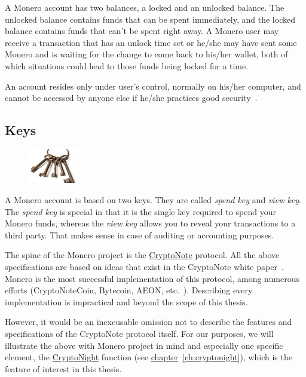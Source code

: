 A Monero account has two balances, a locked and an unlocked balance. The unlocked balance contains funds that can be spent immediately, and the locked balance contains funds that can't be spent right away. A Monero user may receive a transaction that has an unlock time set or he/she may have sent some Monero and is waiting for the change to come back to his/her wallet, both of which situations could lead to those funds being locked for a time.

An account resides only under user's control, normally on his/her computer, and cannot be accessed by anyone else if he/she practices good security~\cite{getmonero}.

\subsection{Keys}
\begin{figure}
\centering
\includegraphics[width=0.2\textwidth]{Images/Monero/keys.jpg}
\end{figure}
A Monero account is based on two keys. They are called \emph{spend key} and \emph{view key}. The \emph{spend key} is special in that it is the single key required to spend your Monero funds, whereas the \emph{view key} allows you to reveal your transactions to a third party. That makes sense in case of auditing or accounting purposes.
\vspace{0.8cm}

The spine of the Monero project is the \hyperref[sec:CryptoNote]{CryptoNote} protocol. All the above specifications are based on ideas that exist in the CryptoNote white paper~\cite{citeulike:14139412}. Monero is the most successful implementation of this protocol, among numerous efforts (CryptoNoteCoin, Bytecoin, AEON, etc.~\cite{cryptonotecoins}). Describing every implementation is impractical and beyond the scope of this thesis.

However, it would be an inexcusable omission not to describe the features and specifications of the CryptoNote protocol itself. For our purposes, we will illustrate the above with Monero project in mind and especially one specific element, the \hyperref[ch:cryptonight]{CryptoNight} function (see \hyperref[ch:cryptonight]{chapter}~\ref{ch:cryptonight}), which is the feature of interest in this thesis.

